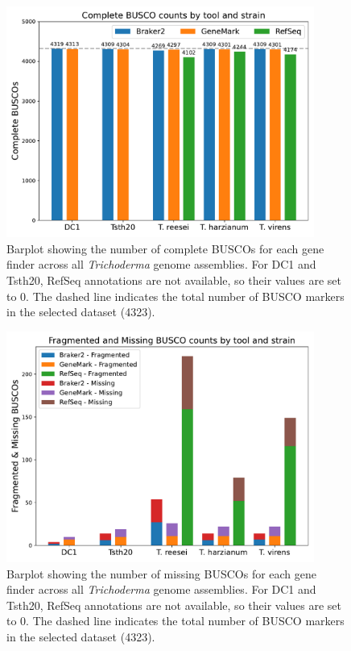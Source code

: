\begin{figure}
  \centering
  \includegraphics[width=0.90\textwidth]{figures/busco-complete-counts.pdf}
  \caption[Complete BUSCO counts]{Barplot showing the number of complete BUSCOs for each gene finder across all \textit{Trichoderma} genome assemblies. For DC1 and Tsth20, RefSeq annotations are not available, so their values are set to 0. The dashed line indicates the total number of BUSCO markers in the selected dataset (4323).}
  \label{fig:busco-complete}
\end{figure}

\begin{figure}
  \centering
  \includegraphics[width=0.90\textwidth]{figures/busco-missing-counts.pdf}
  \caption[Missing BUSCO counts]{Barplot showing the number of missing BUSCOs for each gene finder across all \textit{Trichoderma} genome assemblies. For DC1 and Tsth20, RefSeq annotations are not available, so their values are set to 0. The dashed line indicates the total number of BUSCO markers in the selected dataset (4323).}
  \label{fig:busco-missing}
\end{figure}

